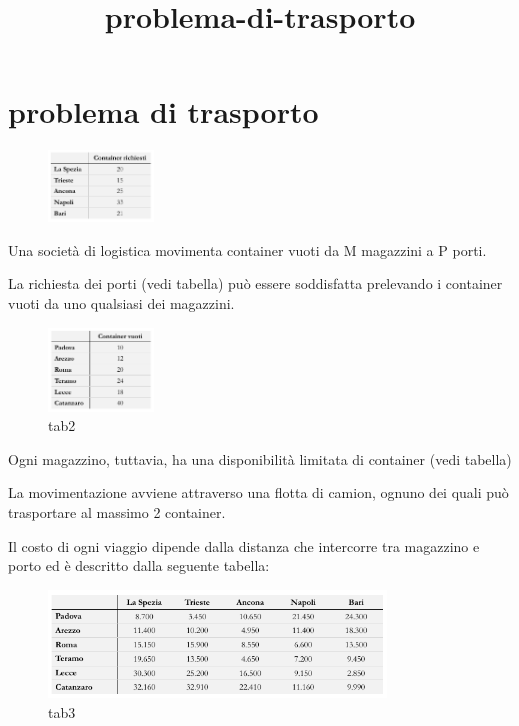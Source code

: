 \documentclass[11pt]{article}
\title{problema-di-trasporto}
\begin{document}
    
    \maketitle
    
    

    
    \hypertarget{problema-di-trasporto}{%
\section{problema di trasporto}\label{problema-di-trasporto}}


\begin{figure}
    \centering
    \vspace{-20pt}
    \includegraphics[width=0.25\textwidth]{./tab1.png}
\end{figure}

Una società di logistica movimenta container vuoti da M magazzini a P
porti.


La richiesta dei porti (vedi tabella) può essere soddisfatta prelevando
i container vuoti da uno qualsiasi dei magazzini.


\begin{figure}
    \centering
    \vspace{-75pt}
    \includegraphics[width=0.25\textwidth]{./tab2.png}
    \caption{tab2}
\end{figure}

Ogni magazzino, tuttavia, ha una disponibilità limitata di container
(vedi tabella)

La movimentazione avviene attraverso una flotta di camion, ognuno dei
quali può trasportare al massimo 2 container.

Il costo di ogni viaggio dipende dalla distanza che intercorre tra
magazzino e porto ed è descritto dalla seguente tabella:

\begin{figure}
    \centering
    \includegraphics[width=0.80\textwidth]{./tab3.png}
\caption{tab3}
\end{figure}
\end{document}
